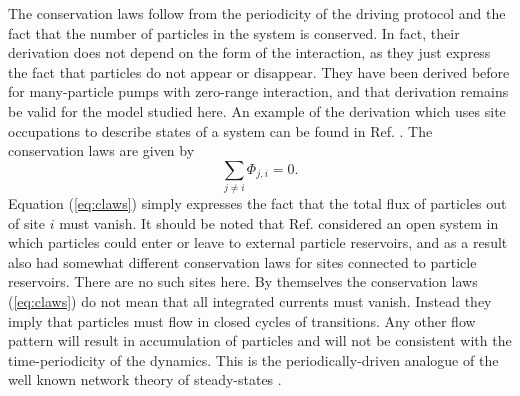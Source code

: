 \documentclass[aps,pre,showpacs,amsmath,amssymb,amsfonts,superscriptaddress,onecolumn,longbibliography]{revtex4-1}
\begin{document}
The conservation laws follow from the periodicity of the driving protocol and the fact that the number of particles in the system
is conserved. In fact, their derivation does not depend
on the form of the interaction, as they just express the fact that particles do not appear or disappear. They have been
derived before for many-particle pumps with zero-range interaction, and that derivation remains be valid for the model studied here. An example of the derivation
which uses site occupations to describe states of a system can be found in Ref. \cite{mandal_unification_2014}. The
 conservation laws are given by
\begin{equation}
\label{eq:claws}
  \sum_{j\ne i} \Phi_{j,i}=0.
\end{equation}
Equation (\ref{eq:claws}) simply expresses the fact that the total flux of particles out of site $i$ must vanish.
It should be noted that Ref. \cite{mandal_unification_2014} considered an open system in which particles could enter or leave to external particle
reservoirs, and as a result also had somewhat different
conservation laws for sites connected to particle reservoirs. There are no such sites here.
By themselves the conservation laws (\ref{eq:claws}) do not mean that all integrated currents must vanish. Instead they imply that particles must flow in closed cycles of transitions. Any other flow pattern will result in accumulation of particles and will
not be consistent with the time-periodicity of the dynamics. This is the periodically-driven analogue of the well known network theory of steady-states \cite{Schnakenberg1976}.
\end{document}
